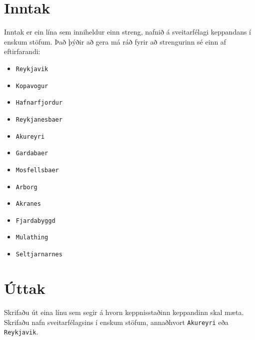 \section*{Inntak}
Inntak er ein lína sem inniheldur einn streng, nafnið á sveitarfélagi keppandans í enskum stöfum.
Það þýðir að gera má ráð fyrir að strengurinn sé einn af eftirfarandi:
\begin{itemize}
    \item \texttt{Reykjavik}
    \item \texttt{Kopavogur}
    \item \texttt{Hafnarfjordur}
    \item \texttt{Reykjanesbaer}
    \item \texttt{Akureyri}
    \item \texttt{Gardabaer}
    \item \texttt{Mosfellsbaer}
    \item \texttt{Arborg}
    \item \texttt{Akranes}
    \item \texttt{Fjardabyggd}
    \item \texttt{Mulathing}
    \item \texttt{Seltjarnarnes}
\end{itemize}

\section*{Úttak}
Skrifaðu út eina línu sem segir á hvorn keppnisstaðinn keppandinn skal mæta.
Skrifaðu nafn sveitarfélagsins í enskum stöfum, annaðhvort \texttt{Akureyri} eða \texttt{Reykjavik}.
